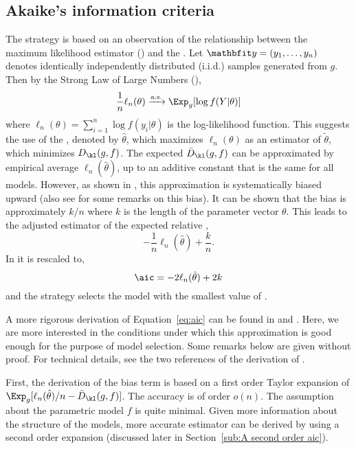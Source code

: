 \subsection{Akaike's information criteria}
\label{sub:Akaike's information criteria}

The \aic strategy is based on an observation of the relationship between the
maximum likelihood estimator (\mle) and the \kld. Let $\data =
(y_1,\dots,y_n)$ denotes identically independently distributed (i.i.d.)
samples generated from $g$. Then by the Strong Law of Large Numbers (\slln),
\begin{equation}
  \frac{1}{n}\ell_n(\theta) \xrightarrow{\text{a.s.}} \Exp_g[\log f(Y|\theta)]
  \label{eq:ml convergence}
\end{equation}
where $\ell_n(\theta) = \sum_{i=1}^n \log f(y_i|\theta)$ is the
log-likelihood function. This suggests the use of the \mle, denoted by
$\hat\theta$, which maximizes $\ell_n(\theta)$ as an estimator of
$\tilde\theta$, which minimizes $D_{\kl}(g,f)$. The expected \kld
$\bar{D}_{\kl}(g,f)$ can be approximated by empirical average
$\ell_n(\hat\theta)$, up to an additive constant that is the same for all
models. However, as shown in \cite{Akaike:1973uc}, this approximation is
systematically biased upward (also see \cite[][sec.~2.3]{Claeskens:2008tq}
for some remarks on this bias). It can be shown that the bias is
approximately $k/n$ where $k$ is the length of the parameter vector $\theta$.
This leads to the adjusted estimator of the expected relative \kld,
\begin{equation}
  -\frac{1}{n}\ell_n(\hat\theta) + \frac{k}{n}.
\end{equation}
In \cite{Akaike:1973uc} it is rescaled to,
\begin{equation}
  \aic = -2\ell_n(\hat\theta) + 2k
  \label{eq:aic}
\end{equation}
and the \aic strategy selects the model with the smallest value of \aic.

A more rigorous derivation of Equation~\eqref{eq:aic} can be found in
\cite[][sec.~2.3]{Claeskens:2008tq} and \cite[][sec.~6.2]{Burnham:2002wc}.
Here, we are more interested in the conditions under which this approximation
is good enough for the purpose of model selection. Some remarks below are
given without proof. For technical details, see the two references of the
derivation of \aic.

First, the derivation of the bias term is based on a first order Taylor
expansion of $\Exp_g[\ell_n(\hat\theta)/n - \bar{D}_{\kl}(g,f)]$. The
accuracy is of order $o(n)$. The assumption about the parametric model $f$ is
quite minimal. Given more information about the structure of the models,
more accurate estimator can be derived by using a second order expansion
(discussed later in Section~\ref{sub:A second order aic}).

